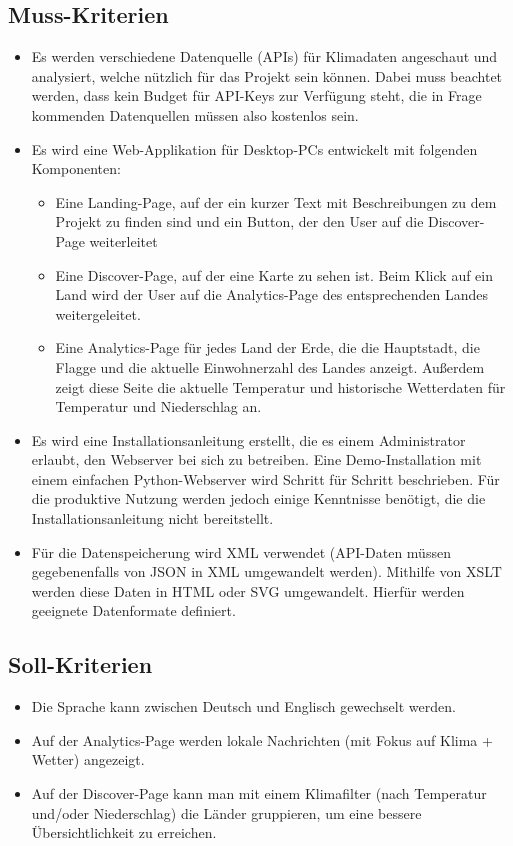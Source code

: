 \documentclass[12pt]{article}
\begin{document}
\subsection*{Muss-Kriterien}
\begin{itemize}
	\item Es werden verschiedene Datenquelle (APIs) für Klimadaten angeschaut und analysiert, welche nützlich für das Projekt sein können. Dabei muss beachtet werden, dass kein Budget für API-Keys zur Verfügung steht, die in Frage kommenden Datenquellen müssen also kostenlos sein.
    \item Es wird eine Web-Applikation für Desktop-PCs entwickelt mit folgenden Komponenten:
    \begin{itemize}
		\item Eine Landing-Page, auf der ein kurzer Text mit Beschreibungen zu dem Projekt zu finden sind und ein Button, der den User auf die Discover-Page weiterleitet
		\item Eine Discover-Page, auf der eine Karte zu sehen ist. Beim Klick auf ein Land wird der User auf die Analytics-Page des entsprechenden Landes weitergeleitet.
		\item Eine Analytics-Page für jedes Land der Erde, die die Hauptstadt, die Flagge und die aktuelle Einwohnerzahl des Landes anzeigt. Außerdem zeigt diese Seite die aktuelle Temperatur und historische Wetterdaten für Temperatur und Niederschlag an.
	\end{itemize}
    \item Es wird eine Installationsanleitung erstellt, die es einem Administrator erlaubt, den Webserver bei sich zu betreiben. Eine Demo-Installation mit einem einfachen Python-Webserver wird Schritt für Schritt beschrieben. Für die produktive Nutzung werden jedoch einige Kenntnisse benötigt, die die Installationsanleitung nicht bereitstellt.
    \item Für die Datenspeicherung wird XML verwendet (API-Daten müssen gegebenenfalls von JSON in XML umgewandelt werden). Mithilfe von XSLT werden diese Daten in HTML oder SVG umgewandelt. Hierfür werden geeignete Datenformate definiert.
\end{itemize}

\subsection*{Soll-Kriterien}
\begin{itemize}
    \item Die Sprache kann zwischen Deutsch und Englisch gewechselt werden.
    \item Auf der Analytics-Page werden lokale Nachrichten (mit Fokus auf Klima + Wetter) angezeigt.
    \item Auf der Discover-Page kann man mit einem Klimafilter (nach Temperatur und/oder Niederschlag) die Länder gruppieren, um eine bessere Übersichtlichkeit zu erreichen.
\end{itemize}
\end{document}
